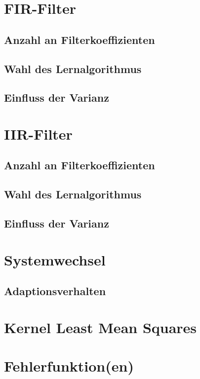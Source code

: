 \section{FIR-Filter}
\label{sec:1}

\subsection{Anzahl an Filterkoeffizienten}
\subsection{Wahl des Lernalgorithmus}
\subsection{Einfluss der Varianz}


\section{IIR-Filter}
\label{sec:2}

\subsection{Anzahl an Filterkoeffizienten}
\subsection{Wahl des Lernalgorithmus}
\subsection{Einfluss der Varianz}


\section{Systemwechsel}
\label{sec:3}

\subsection{Adaptionsverhalten}


\section{Kernel Least Mean Squares}
\label{sec:3}


\section{Fehlerfunktion(en)}